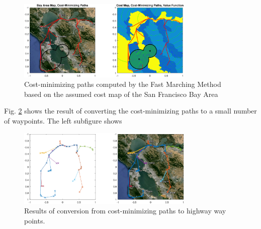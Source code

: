 \begin{figure}
	\centering
	\includegraphics[width=0.75\textwidth]{"fig/airHighway_results"}
	\caption{Cost-minimizing paths computed by the Fast Marching Method based on the assumed cost map of the San Francisco Bay Area}
	\label{fig:airHighway_results}
\end{figure}

Fig. \ref{fig:airHighway_sparse} shows the result of converting the cost-minimizing paths to a small number of waypoints. The left subfigure shows 

\begin{figure}
	\centering
	\includegraphics[width=0.75\textwidth]{"fig/airHighway_sparse"}
	\caption{Results of conversion from cost-minimizing paths to highway way points.}
	\label{fig:airHighway_sparse}
\end{figure}